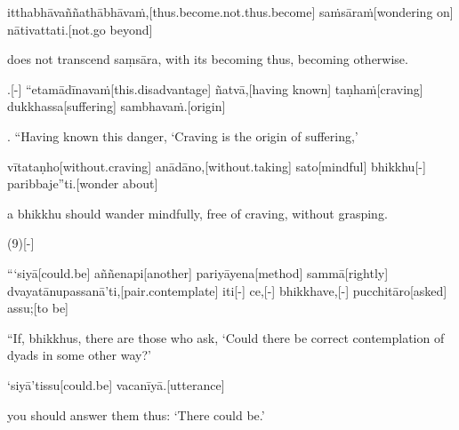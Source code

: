 \begin{samepage}
\begingl[glneveryline={\PaliGlossA,\PaliGlossB}]
itthabhāvaññathābhāvaṁ,[thus.become.not.thus.become] saṁsāraṁ[wondering on] nātivattati.[not.go beyond]
\endgl
\nopagebreak
\linespread{0.5}
\begin{spacin}{0.2}
{\PaliGlossFT does not transcend saṃsāra,  with its becoming thus, becoming otherwise.}
\end{spacin}
\vskip 12pt
\end{samepage}
\begin{samepage}
.[-] “etamādīnavaṁ[this.disadvantage] ñatvā,[having known] taṇhaṁ[craving] dukkhassa[suffering] sambhavaṁ.[origin]
\endgl
\nopagebreak
\linespread{0.5}
\begin{spacin}{0.2}
{. “Having known this danger, ‘Craving is the origin of suffering,’}
\end{spacin}
\vskip 12pt
\end{samepage}
\begin{samepage}
\begingl[glneveryline={\PaliGlossA,\PaliGlossB}]
vītataṇho[without.craving] anādāno,[without.taking] sato[mindful] bhikkhu[-] paribbaje”ti.[wonder about]
\endgl
\nopagebreak
\linespread{0.5}
\begin{spacin}{0.2}
{\PaliGlossFT a bhikkhu should wander mindfully, free of craving, without grasping.}
\end{spacin}
\vskip 12pt
\end{samepage}
\vskip 0.2in
\begin{samepage}
\begingl[glneveryline={\PaliGlossA,\PaliGlossB}]
(9)[-]
\endgl
\nopagebreak
\linespread{0.5}
\begin{spacin}{0.2}
{\PaliGlossFT [9. Clinging]}
\end{spacin}
\vskip 12pt
\end{samepage}
\begin{samepage}
\begingl[glneveryline={\PaliGlossA,\PaliGlossB}]
“‘siyā[could.be] aññenapi[another] pariyāyena[method] sammā[rightly] dvayatānupassanā’ti,[pair.contemplate] iti[-] ce,[-] bhikkhave,[-] pucchitāro[asked] assu;[to be]
\endgl
\nopagebreak
\linespread{0.5}
\begin{spacin}{0.2}
{\PaliGlossFT “If, bhikkhus, there are those who ask, ‘Could there be correct contemplation of dyads in some other way?’}
\end{spacin}
\vskip 12pt
\end{samepage}
\begin{samepage}
\begingl[glneveryline={\PaliGlossA,\PaliGlossB}]
‘siyā’tissu[could.be] vacanīyā.[utterance]
\endgl
\nopagebreak
\linespread{0.5}
\begin{spacin}{0.2}
{\PaliGlossFT you should answer them thus: ‘There could be.’}
\end{spacin}
\vskip 12pt
\end{samepage}
